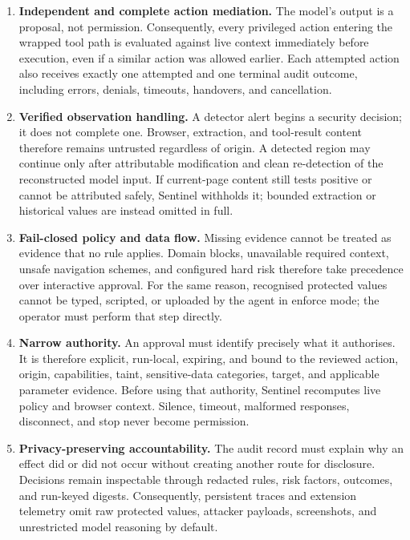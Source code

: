 \begin{enumerate}[label=\textbf{R\arabic*:},leftmargin=16mm]
  \item \textbf{Independent and complete action mediation.} The model's output
  is a proposal, not permission. Consequently, every privileged action entering
  the wrapped tool path is evaluated against live context immediately before
  execution, even if a similar action was allowed earlier. Each attempted
  action also receives exactly one attempted and one terminal audit outcome,
  including errors, denials, timeouts, handovers, and cancellation.

  \item \textbf{Verified observation handling.} A detector alert begins a
  security decision; it does not complete one. Browser, extraction, and
  tool-result content therefore remains untrusted regardless of origin. A
  detected region may continue only after attributable modification and clean
  re-detection of the reconstructed model input. If current-page content still
  tests positive or cannot be attributed safely, Sentinel withholds it;
  bounded extraction or historical values are instead omitted in full.

  \item \textbf{Fail-closed policy and data flow.} Missing evidence cannot be
  treated as evidence that no rule applies. Domain blocks, unavailable required
  context, unsafe navigation schemes, and configured hard risk therefore take
  precedence over interactive approval. For the same reason, recognised
  protected values cannot be typed, scripted, or uploaded by the agent in
  enforce mode; the operator must perform that step directly.

  \item \textbf{Narrow authority.} An approval must identify precisely what it
  authorises. It is therefore explicit, run-local, expiring, and bound to the
  reviewed action, origin, capabilities, taint, sensitive-data categories,
  target, and applicable parameter evidence. Before using that authority,
  Sentinel recomputes live policy and browser context. Silence, timeout,
  malformed responses, disconnect, and stop never become permission.

  \item \textbf{Privacy-preserving accountability.} The audit record must
  explain why an effect did or did not occur without creating another route for
  disclosure. Decisions remain inspectable through redacted rules, risk
  factors, outcomes, and run-keyed digests. Consequently, persistent traces and
  extension telemetry omit raw protected values, attacker payloads,
  screenshots, and unrestricted model reasoning by default.
\end{enumerate}

